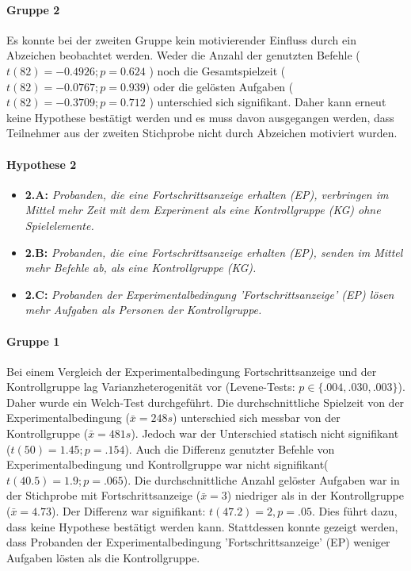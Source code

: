 \paragraph{Gruppe 2}
Es konnte bei der zweiten Gruppe kein motivierender Einfluss durch ein Abzeichen beobachtet werden. Weder die Anzahl der genutzten Befehle ( $ t(82)=-0.4926; p=0.624 $ ) noch die Gesamtspielzeit ($t(82)=-0.0767; p=0.939$) oder die gelösten Aufgaben ( $t(82)=-0.3709; p=0.712$ ) unterschied sich signifikant. Daher kann erneut keine Hypothese bestätigt werden und es muss davon ausgegangen werden, dass Teilnehmer aus der zweiten Stichprobe nicht durch Abzeichen motiviert wurden. 


\paragraph{Hypothese 2}
\begin{itemize}
    \item \textbf{2.A:} \textit{Probanden, die eine Fortschrittsanzeige erhalten (EP), verbringen im Mittel mehr Zeit mit dem Experiment als eine Kontrollgruppe (KG) ohne Spielelemente.}
    \item \textbf{2.B:} \textit{Probanden, die eine Fortschrittsanzeige erhalten (EP), senden im Mittel mehr Befehle ab, als eine Kontrollgruppe (KG).}
    \item \textbf{2.C:} \textit{Probanden der Experimentalbedingung 'Fortschrittsanzeige' (EP) lösen mehr Aufgaben als Personen der Kontrollgruppe.} 
\end{itemize}

\paragraph{Gruppe 1}
Bei einem Vergleich der Experimentalbedingung Fortschrittsanzeige und der Kontrollgruppe lag Varianzheterogenität vor (Levene-Tests: $p\in\{.004, .030, .003\}$). Daher wurde ein Welch-Test durchgeführt. Die durchschnittliche Spielzeit von der Experimentalbedingung ($\bar{x}=248 s $) unterschied sich messbar von der Kontrollgruppe ($\bar{x}=481 s$). Jedoch war der Unterschied statisch nicht signifikant ($t(50)=1.45; p=.154$). Auch die Differenz genutzter Befehle von Experimentalbedingung und Kontrollgruppe war nicht signifikant($t(40.5)=1.9; p=.065$). Die durchschnittliche Anzahl gelöster Aufgaben war in der Stichprobe mit Fortschrittsanzeige ($\bar{x}=3$) niedriger als in der Kontrollgruppe ($\bar{x}= 4.73$). Der Differenz war signifikant: $t(47.2)=2, p=.05$. Dies führt dazu, dass keine Hypothese bestätigt werden kann. Stattdessen konnte gezeigt werden, dass Probanden der Experimentalbedingung 'Fortschrittsanzeige' (EP) weniger Aufgaben lösten als die Kontrollgruppe. 


